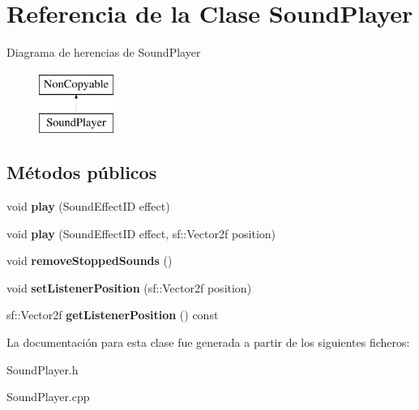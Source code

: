 \hypertarget{classSoundPlayer}{}\section{Referencia de la Clase Sound\+Player}
\label{classSoundPlayer}
Diagrama de herencias de Sound\+Player\begin{figure}[H]
\begin{center}
\leavevmode
\includegraphics[height=2.000000cm]{classSoundPlayer}
\end{center}
\end{figure}
\subsection*{Métodos públicos}
\begin{DoxyCompactItemize}
\item 
\hypertarget{classSoundPlayer_a016133f69b26dc403af68760a4ca9ed3}{}void {\bfseries play} (Sound\+Effect\+I\+D effect)\label{classSoundPlayer_a016133f69b26dc403af68760a4ca9ed3}

\item 
\hypertarget{classSoundPlayer_aa596ffd50028d9614f14fcd55c22dbc2}{}void {\bfseries play} (Sound\+Effect\+I\+D effect, sf\+::\+Vector2f position)\label{classSoundPlayer_aa596ffd50028d9614f14fcd55c22dbc2}

\item 
\hypertarget{classSoundPlayer_a3fd165dadf60b580b16367b81d84681b}{}void {\bfseries remove\+Stopped\+Sounds} ()\label{classSoundPlayer_a3fd165dadf60b580b16367b81d84681b}

\item 
\hypertarget{classSoundPlayer_abfd270417c9490f1c0f92b0c4986fa52}{}void {\bfseries set\+Listener\+Position} (sf\+::\+Vector2f position)\label{classSoundPlayer_abfd270417c9490f1c0f92b0c4986fa52}

\item 
\hypertarget{classSoundPlayer_ae0ec5bc31ee027fab6e71984ff13388d}{}sf\+::\+Vector2f {\bfseries get\+Listener\+Position} () const \label{classSoundPlayer_ae0ec5bc31ee027fab6e71984ff13388d}

\end{DoxyCompactItemize}


La documentación para esta clase fue generada a partir de los siguientes ficheros\+:\begin{DoxyCompactItemize}
\item 
Sound\+Player.\+h\item 
Sound\+Player.\+cpp\end{DoxyCompactItemize}
